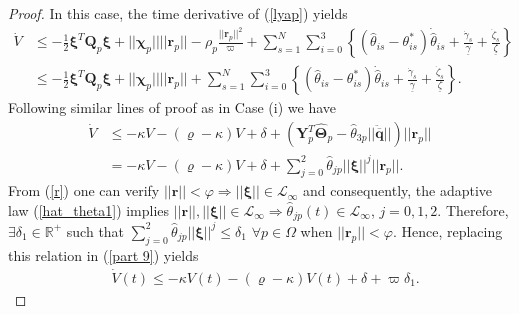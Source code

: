\begin{proof}
	In this case, the time derivative of (\ref{lyap}) yields
	\begin{align}
	\dot{V} &\leq -\frac{1}{2} \boldsymbol{\xi}^T \mathbf Q_p\boldsymbol{\xi} + || \boldsymbol \chi_{p}  || || \mathbf{r}_p ||  - \rho_p\frac{{|| \mathbf r_p||}^2}{\varpi}  +\sum_{s=1}^{N} \sum_{i=0}^{3}\left \lbrace (\hat{\theta}_{is} -{\theta}_{is}^{*})\dot{\hat{\theta}}_{is}+ \frac{\dot{\gamma}_{s}}{\underline{\gamma}}+\frac{\dot{\zeta}_{s}}{\underline{\zeta}} \right \rbrace \\%
	& \leq  - \frac{1}{2} \boldsymbol{\xi}^T \mathbf Q_p\boldsymbol{\xi} + || \boldsymbol \chi_{p}  || || \mathbf{r}_p || +\sum_{s=1}^{N} \sum_{i=0}^{3}\left \lbrace (\hat{\theta}_{is} -{\theta}_{is}^{*})\dot{\hat{\theta}}_{is}+ \frac{\dot{\gamma}_{s}}{\underline{\gamma}}+\frac{\dot{\zeta}_{s}}{\underline{\zeta}}\right \rbrace. \label{part 8}
	\end{align}
	Following similar lines of proof as in Case (i) we have
	\begin{align}
	\dot{V} &\leq - \kappa V - (\varrho - \kappa)V + \delta + (\mathbf{Y}^T_p \hat{\boldsymbol \Theta}_p - \hat{\theta}_{3p} || \ddot{\overline{\mathbf q}} ||) || \mathbf{r}_p || \nonumber \\
	& = - \kappa V - (\varrho - \kappa)V + \delta + \sum_{j=0}^{2} \hat{\theta}_{jp}||\boldsymbol \xi ||^j || \mathbf{r}_p || . \label{part 9}
	\end{align}
	From (\ref{r}) one can verify $||\mathbf{r}|| < \varphi \Rightarrow || \boldsymbol \xi || \in \mathcal{L}_{\infty} $ and consequently, the adaptive law (\ref{hat_theta1}) implies $||\mathbf{r}|| , || \boldsymbol \xi || \in \mathcal{L}_{\infty} \Rightarrow \hat{\theta}_{jp} (t) \in \mathcal{L}_{\infty}$, $j=0,1,2$. Therefore, $\exists \delta_1 \in \mathbb{R}^{+}$ such that $\sum_{j=0}^{2} \hat{\theta}_{jp}||\boldsymbol \xi ||^j \leq \delta_1$ $\forall p \in \Omega$ when $||\mathbf r_{p}|| < \varphi$. Hence, replacing this relation in (\ref{part 9}) yields 
	\begin{align}
	&\dot{V}(t) \leq - \kappa V(t) - (\varrho - \kappa)V(t) + \delta + \varpi \delta_1 . \label{part 10}

\end{align}
\end{proof}
